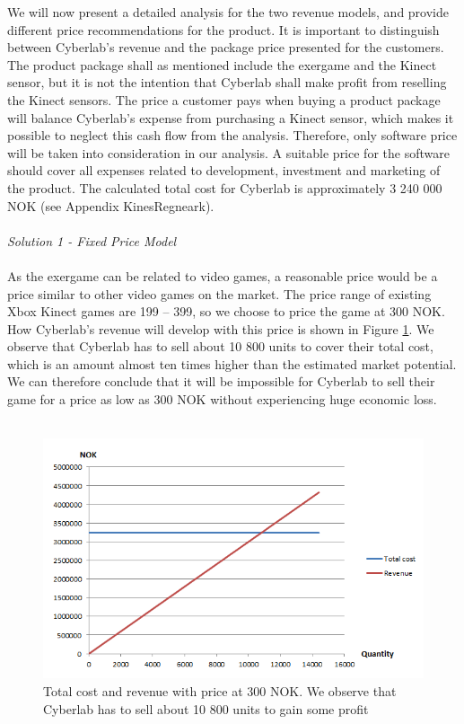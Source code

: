 We will now present a detailed analysis for the two revenue models, and provide different price recommendations for the product. It is important to distinguish between Cyberlab's revenue and the package price presented for the customers. The product package shall as mentioned include the exergame and the Kinect sensor, but it is not the intention that Cyberlab shall make profit from reselling the Kinect sensors. The price a customer pays when buying a product package will balance Cyberlab's expense from purchasing a Kinect sensor, which makes it possible to neglect this cash flow from the analysis. Therefore, only software price will be taken into consideration in our analysis. A suitable price for the software should cover all expenses related to development, investment and marketing of the product. The calculated total cost for Cyberlab is approximately 3 240 000 NOK (see Appendix KinesRegneark). \\ \\ 
\emph{Solution 1 - Fixed Price Model}\\ \\
As the exergame can be related to video games, a reasonable price would be a price similar to other video games on the market. The price range of existing Xbox Kinect games are 199 – 399, so we choose to price the game at 300 NOK. How Cyberlab’s revenue will develop with this price is shown in Figure \ref{fig:FixedLowPrice}. We observe that Cyberlab has to sell about 10 800 units to cover their total cost, which is an amount almost ten times higher than the estimated market potential. We can therefore conclude that it will be impossible for Cyberlab to sell their game for a price as low as 300 NOK without experiencing huge economic loss.\\ \\
\begin{figure}
\begin{center}
\includegraphics[scale=0.7]{fixedlowprice}
\caption[Price related to commercial video games]{Total cost and revenue with price at 300 NOK. We observe that Cyberlab has to sell about 10 800 units to gain some profit}
\label{fig:FixedLowPrice}
\end{center}
\end{figure}
